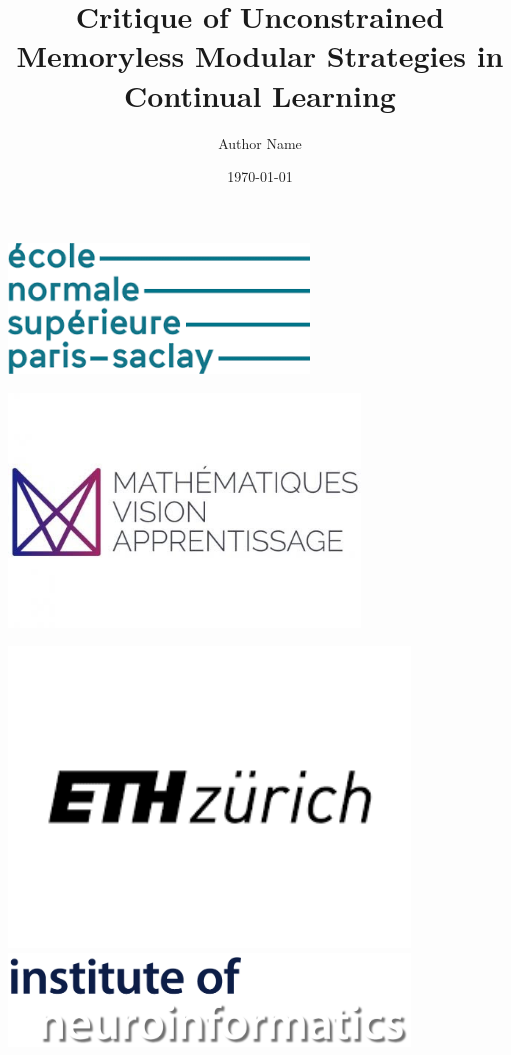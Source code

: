\documentclass[11pt]{article}
\title{Critique of Unconstrained Memoryless Modular Strategies in Continual Learning}
\author{Author Name}
\date{\today}
\begin{document}
\begin{titlepage}
    \centering

    \begin{center}
        \begin{minipage}{0.4\textwidth}
            \vspace{1cm}
            \hspace{1cm}
            \includegraphics[width=0.6\textwidth]{images/logo_ENS.png}
            
            \hspace{1cm}
            \includegraphics[width=0.7\textwidth]{images/logo_MVA.png}
        \end{minipage}
        \hfill
        \begin{minipage}{0.4\textwidth}
            \vspace{-1cm}
            \includegraphics[width=0.8\textwidth]{images/logo_ETH.png}
            \vspace{0.7cm}
            \includegraphics[width=0.8\textwidth]{images/logo_INI.png}
        \end{minipage}
    \end{center}


\end{titlepage}
\end{document}
